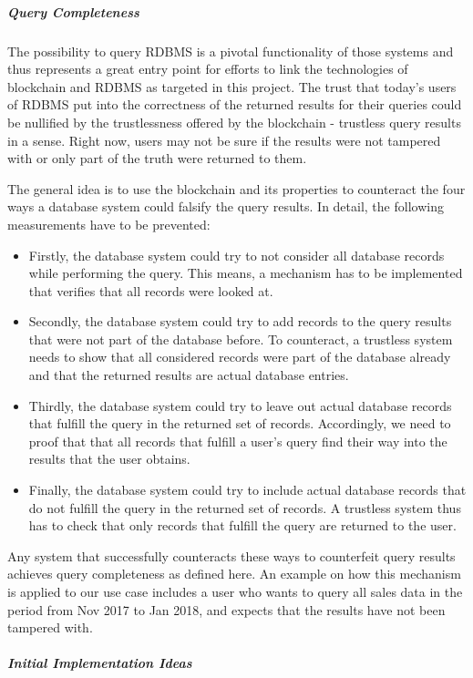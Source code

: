 \subparagraph{Query Completeness}

The possibility to query RDBMS is a pivotal functionality of those systems and thus represents a great entry point for efforts to link the technologies of blockchain and RDBMS as targeted in this project. The trust that today’s users of RDBMS put into the correctness of the returned results for their queries could be nullified by the trustlessness offered by the blockchain - trustless query results in a sense. Right now, users may not be sure if the results were not tampered with or only part of the truth were returned to them.

The general idea is to use the blockchain and its properties to counteract the four ways a database system could falsify the query results. In detail, the following measurements have to be prevented:
\begin{itemize}
	\item Firstly, the database system could try to not consider all database records while performing the query. This means, a mechanism has to be implemented that verifies that all records were looked at.
	\item Secondly, the database system could try to add records to the query results that were not part of the database before. To counteract, a trustless system needs to show that all considered records were part of the database already and that the returned results are actual database entries.
	\item Thirdly, the database system could try to leave out actual database records that fulfill the query in the returned set of records. Accordingly, we need to proof that that all records that fulfill a user’s query find their way into the results that the user obtains.
	\item Finally, the database system could try to include actual database records that do not fulfill the query in the returned set of records. A trustless system thus has to check that only records that fulfill the query are returned to the user.
\end{itemize} 

Any system that successfully counteracts these ways to counterfeit query results achieves query completeness as defined here. An example on how this mechanism is applied to our use case includes a user who wants to query all sales data in the period from Nov 2017 to Jan 2018, and expects that the results have not been tampered with.

\subparagraph{Initial Implementation Ideas}

